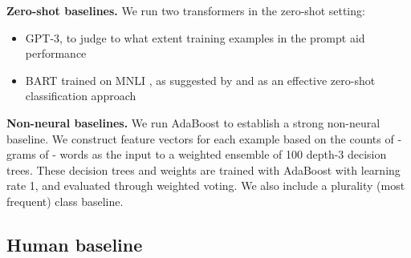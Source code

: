 \documentclass{article}
\begin{document}
\textbf{Zero-shot baselines.} We run two transformers in the zero-shot setting: 
\begin{itemize}
    \item GPT-3, to judge to what extent training examples in the prompt aid performance
    \item BART \citep{bart2019lewis} trained on MNLI \citep{mnli2017williams}, as suggested by \citet{zeroshot2019yin} and \citet{davison2020zeroshotlearning} as an effective zero-shot classification approach
\end{itemize}

\textbf{Non-neural baselines.} We run AdaBoost \citep{FREUND1997119} to establish a strong non-neural baseline. We construct feature vectors for each example based on the counts of -grams of - words as the input to a weighted ensemble of 100 depth-3 decision trees. These decision trees and weights are trained with AdaBoost with learning rate 1, and evaluated through weighted voting. We also include a plurality (most frequent) class baseline.

\iffalse

For Naive Bayes and AdaBoost (citation?) we used a different featurizer than our neural baselines. We concatenated all non-label data in every training example into a single string, separated by periods, then constructed -grams from all words and adjacent sets of  words in the dataset for  after removing letter cases and certain special symbols. Each training or test example was vectorized as the count of each -gram in the example.
\begin{itemize}
    \item \textbf{Naive Bayes} -- We trained a Multinomial Naive Bayes model with Laplace smoothing parameter . 
    
    \item \textbf{AdaBoost} -- For the base estimator, we used decision trees with a maximum depth of 3. We ensembled 100 estimators with a learning rate of 1.0.
    
    \item \textbf{Plurality class} -- We simply classified every example with the most frequent class label in the training set.
\end{itemize}

\fi

\subsection{Human baseline}
\end{document}
